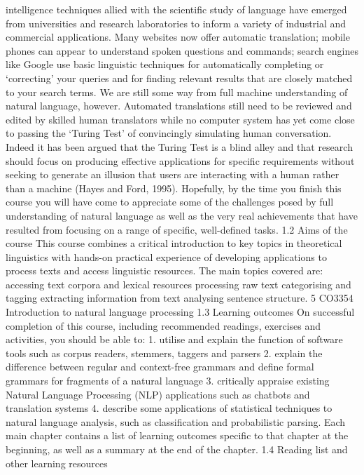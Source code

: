 intelligence techniques allied with the scientific study of language have emerged
from universities and research laboratories to inform a variety of industrial and
commercial applications. Many websites now offer automatic translation; mobile
phones can appear to understand spoken questions and commands; search engines
like Google use basic linguistic techniques for automatically completing or
‘correcting’ your queries and for finding relevant results that are closely matched to
your search terms. We are still some way from full machine understanding of natural
language, however. Automated translations still need to be reviewed and edited by
skilled human translators while no computer system has yet come close to passing
the ‘Turing Test’ of convincingly simulating human conversation. Indeed it has been
argued that the Turing Test is a blind alley and that research should focus on
producing effective applications for specific requirements without seeking to
generate an illusion that users are interacting with a human rather than a machine
(Hayes and Ford, 1995). Hopefully, by the time you finish this course you will have
come to appreciate some of the challenges posed by full understanding of natural
language as well as the very real achievements that have resulted from focusing on a
range of specific, well-defined tasks.
1.2 Aims of the course
This course combines a critical introduction to key topics in theoretical linguistics
with hands-on practical experience of developing applications to process texts and
access linguistic resources. The main topics covered are:
accessing text corpora and lexical resources
processing raw text
categorising and tagging
extracting information from text
analysing sentence structure.
5
CO3354 Introduction to natural language processing
1.3 Learning outcomes
On successful completion of this course, including recommended readings, exercises
and activities, you should be able to:
1. utilise and explain the function of software tools such as corpus readers,
stemmers, taggers and parsers
2. explain the difference between regular and context-free grammars and define
formal grammars for fragments of a natural language
3. critically appraise existing Natural Language Processing (NLP) applications such
as chatbots and translation systems
4. describe some applications of statistical techniques to natural language analysis,
such as classification and probabilistic parsing.
Each main chapter contains a list of learning outcomes specific to that chapter at the
beginning, as well as a summary at the end of the chapter.
1.4 Reading list and other learning resources
